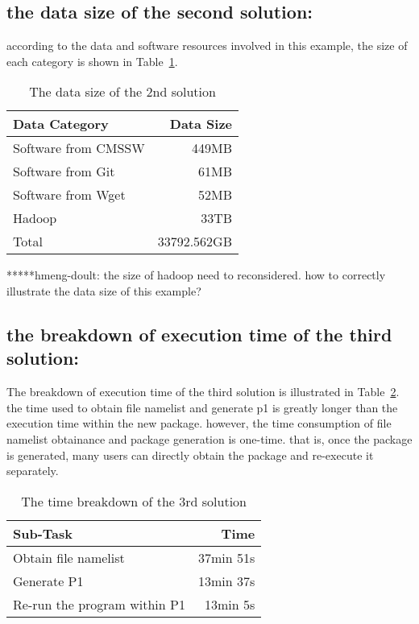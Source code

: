 \documentclass{article}
\begin{document}
\subsection{the data size of the second solution:}
\indent according to the data and software resources involved in this example, the size of each category is shown in Table~\ref{table:datasize-2nd}.

\begin{table}
    \centering
    \begin{tabular}{|l|r|}
    \hline
    Data Category & Data Size \\ \hline
    Software from CMSSW & 449MB \\ \hline
    Software from Git & 61MB \\ \hline
    Software from Wget & 52MB \\ \hline
    Hadoop & 33TB \\ \hline
    Total & 33792.562GB \\ \hline
    \end{tabular}
    \caption{The data size of the 2nd solution}
    \label{table:datasize-2nd}
\end{table}

*****hmeng-doult: the size of hadoop need to reconsidered. how to correctly illustrate the data size of this example?

\subsection{the breakdown of execution time of the third solution: }
\indent The breakdown of execution time of the third solution is illustrated in Table~\ref{table:time-3rd}. the time used to obtain file namelist and generate p1 is greatly longer than the execution time within the new package. however, the time consumption of file namelist obtainance and package generation is one-time. that is, once the package is generated, many users can directly obtain the package and re-execute it separately.

\begin{table}
    \centering
    \begin{tabular}{|l|r|}
    \hline
    Sub-Task & Time \\ \hline
    Obtain file namelist & 37min 51s \\ \hline
    Generate P1 & 13min 37s \\ \hline
    Re-run the program within P1 & 13min 5s \\ \hline
    \end{tabular}
    \caption{The time breakdown of the 3rd solution}
    \label{table:time-3rd}
\end{table}
\end{document}
